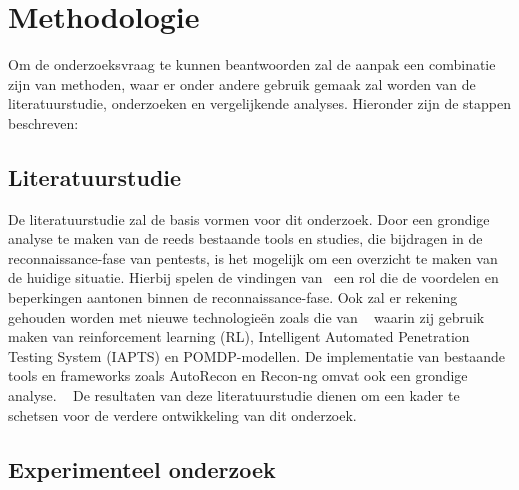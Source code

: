 


\section{Methodologie}
\label{sec:methodologie}

Om de onderzoeksvraag te kunnen beantwoorden zal de aanpak een combinatie zijn van methoden, waar er onder andere gebruik
gemaak zal worden van de literatuurstudie, onderzoeken en vergelijkende analyses. Hieronder zijn de stappen beschreven:

\subsection{Literatuurstudie}

De literatuurstudie zal de basis vormen voor dit onderzoek. Door een grondige analyse te maken van de reeds bestaande tools en studies,
die bijdragen in de reconnaissance-fase van pentests, is het mogelijk om een overzicht te maken van de huidige situatie.
Hierbij spelen de vindingen van~\textcite{Shah,Kothia} een rol die de voordelen en beperkingen aantonen binnen de reconnaissance-fase.
Ook zal er rekening gehouden worden met nieuwe technologieën zoals die van ~\textcite{Ghanem,Hoang} waarin zij gebruik maken van
reinforcement learning (RL), Intelligent Automated Penetration Testing System (IAPTS) en POMDP-modellen. De implementatie van bestaande
tools en frameworks zoals AutoRecon en Recon-ng omvat ook een grondige analyse. ~\autocite{Shebli}
De resultaten van deze literatuurstudie dienen om een kader te schetsen voor de verdere ontwikkeling van dit onderzoek.

\subsection{Experimenteel onderzoek}

